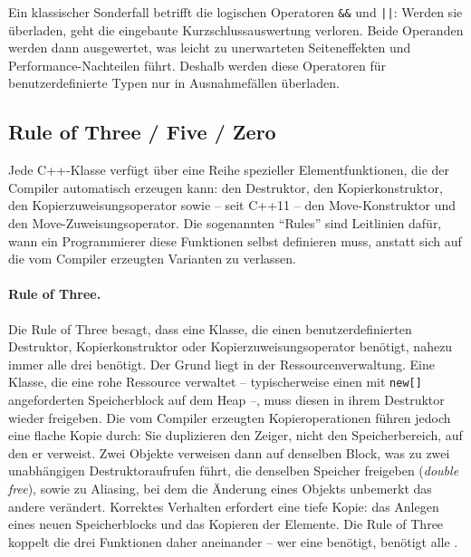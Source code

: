 \documentclass[10pt,a4paper]{article}
\begin{document}
Ein klassischer Sonderfall betrifft die logischen Operatoren \texttt{\&\&}
und \texttt{||}: Werden sie überladen, geht die eingebaute
Kurzschlussauswertung verloren. Beide Operanden werden dann ausgewertet,
was leicht zu unerwarteten Seiteneffekten und Performance-Nachteilen führt.
Deshalb werden diese Operatoren für benutzerdefinierte Typen nur in
Ausnahmefällen überladen.

\subsection{Rule of Three / Five / Zero}
Jede C++-Klasse verfügt über eine Reihe spezieller Elementfunktionen,
die der Compiler automatisch erzeugen kann: den Destruktor, den
Kopierkonstruktor, den Kopierzuweisungsoperator sowie -- seit C++11 --
den Move-Konstruktor und den Move-Zuweisungsoperator. Die sogenannten
``Rules'' sind Leitlinien dafür, wann ein Programmierer diese
Funktionen selbst definieren muss, anstatt sich auf die vom Compiler
erzeugten Varianten zu verlassen.

\paragraph{Rule of Three.}
Die Rule of Three besagt, dass eine Klasse, die einen benutzerdefinierten
Destruktor, Kopierkonstruktor oder Kopierzuweisungsoperator benötigt,
nahezu immer alle drei benötigt. Der Grund liegt in der
Ressourcenverwaltung. Eine Klasse, die eine rohe Ressource verwaltet --
typischerweise einen mit \texttt{new[]} angeforderten Speicherblock auf
dem Heap --, muss diesen in ihrem Destruktor wieder freigeben. Die vom
Compiler erzeugten Kopieroperationen führen jedoch eine flache Kopie
durch: Sie duplizieren den Zeiger, nicht den Speicherbereich, auf den er
verweist. Zwei Objekte verweisen dann auf denselben Block, was zu zwei
unabhängigen Destruktoraufrufen führt, die denselben Speicher
freigeben (\emph{double free}), sowie zu Aliasing, bei dem die Änderung
eines Objekts unbemerkt das andere verändert. Korrektes Verhalten
erfordert eine tiefe Kopie: das Anlegen eines neuen Speicherblocks und
das Kopieren der Elemente. Die Rule of Three koppelt die drei Funktionen
daher aneinander -- wer eine benötigt, benötigt alle \cite{meyers2005,sutter2004}.
\end{document}
